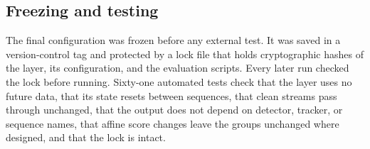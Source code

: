 \subsection{Freezing and testing}\label{sec:freeze}
The final configuration was frozen before any external test. It was saved in
a version-control tag and protected by a lock file that holds cryptographic
hashes of the layer, its configuration, and the evaluation scripts. Every
later run checked the lock before running. Sixty-one automated tests check
that the layer uses no future data, that its state resets between sequences,
that clean streams pass through unchanged, that the output does not depend on
detector, tracker, or sequence names, that affine score changes leave the
groups unchanged where designed, and that the lock is intact.
